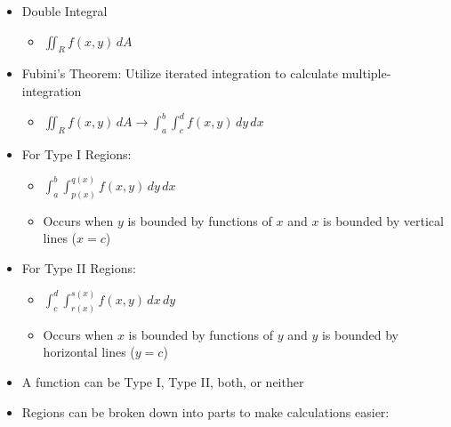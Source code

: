 \begin{itemize}
  \item Double Integral

    \begin{itemize}

      \item $\displaystyle \iint_R f(x,y)\,dA$

    \end{itemize}

  \item Fubini's Theorem: Utilize iterated integration to calculate multiple-integration

    \begin{itemize}

      \item $\displaystyle \iint_R f(x,y)\, dA \longrightarrow\int_a^b\int_c^d f(x,y)\,dy\,dx$

    \end{itemize}

  \item For Type I Regions:

    \begin{itemize}

      \item $\displaystyle \int_a^b\int_{p(x)}^{q(x)} f(x,y)\,dy\,dx$

      \item Occurs when $y$ is bounded by functions of $x$ and $x$ is bounded by vertical lines ($x=c$)

    \end{itemize}

  \item For Type II Regions:

    \begin{itemize}

      \item $\displaystyle \int_c^d\int_{r(x)}^{s(x)} f(x,y)\,dx\,dy$

      \item Occurs when $x$ is bounded by functions of $y$ and $y$ is bounded by horizontal lines ($y=c$)

    \end{itemize}

  \item A function can be Type I, Type II, both, or neither

  \item Regions can be broken down into parts to make calculations easier:

    \begin{itemize}


\end{itemize}
\end{itemize}
